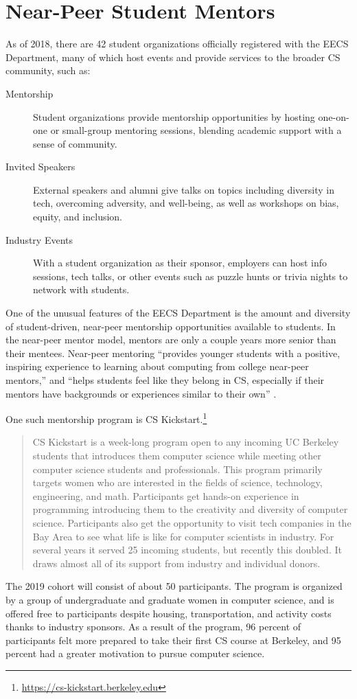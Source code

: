\section{Near-Peer Student Mentors}

As of 2018, there are 42 student organizations officially registered with the EECS Department, many of which host events and provide services to the broader CS community, such as:
\begin{description}
\item[Mentorship] Student organizations provide mentorship opportunities by hosting one-on-one or small-group mentoring sessions, blending academic support with a sense of community.
\item[Invited Speakers] External speakers and alumni give talks on topics including diversity in tech, overcoming adversity, and well-being, as well as workshops on bias, equity, and inclusion.
\item[Industry Events] With a student organization as their sponsor, employers can host info sessions, tech talks, or other events such as puzzle hunts or trivia nights to network with students.
\end{description}
One of the unusual features of the EECS Department is the amount and diversity of student-driven, near-peer mentorship opportunities available to students. In the near-peer mentor model, mentors are only a couple years more senior than their mentees. Near-peer mentoring ``provides younger students with a positive, inspiring experience to learning about computing from college near-peer mentors,'' and ``helps students feel like they belong in CS, especially if their mentors have backgrounds or experiences similar to their own'' \cite{RetentionCS}.

One such mentorship program is CS Kickstart.\footnote{\url{https://cs-kickstart.berkeley.edu}}
\begin{quote}
   CS Kickstart is a week-long program open to any incoming UC Berkeley students that introduces them computer science while meeting other computer science students and professionals. This program primarily targets women who are interested in the fields of science, technology, engineering, and math. Participants get hands-on experience in programming introducing them to the creativity and diversity of computer science. Participants also get the opportunity to visit tech companies in the Bay Area to see what life is like for computer scientists in industry. For several years it served 25 incoming students, but recently this doubled. It draws almost all of its support from industry and individual donors. \cite{Alivisatos:2017}
\end{quote}
The 2019 cohort will consist of about 50 participants. The program is organized by a group of undergraduate and graduate women in computer science, and is offered free to participants despite housing, transportation, and activity costs thanks to industry sponsors. As a result of the program, 96 percent of participants felt more prepared to take their first CS course at Berkeley, and 95 percent had a greater motivation to pursue computer science.

